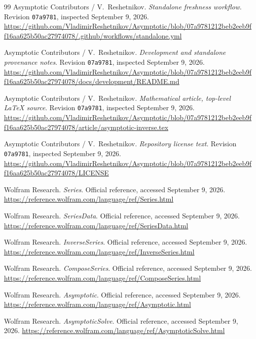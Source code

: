 \documentclass[11pt,a4paper]{article}
\theoremstyle{remark}\newtheorem{remark}[proposition]{Remark}
\begin{document}
\begin{thebibliography}{99}
 Asymptotic Contributors / V.~Reshetnikov. \emph{Standalone freshness workflow}. Revision \texttt{07a9781}, inspected September 9, 2026. \url{https://github.com/VladimirReshetnikov/Asymptotic/blob/07a9781212beb2eeb9ff16aa625b50ac27974078/.github/workflows/standalone.yml}

 Asymptotic Contributors / V.~Reshetnikov. \emph{Development and standalone provenance notes}. Revision \texttt{07a9781}, inspected September 9, 2026. \url{https://github.com/VladimirReshetnikov/Asymptotic/blob/07a9781212beb2eeb9ff16aa625b50ac27974078/docs/development/README.md}

 Asymptotic Contributors / V.~Reshetnikov. \emph{Mathematical article, top-level LaTeX source}. Revision \texttt{07a9781}, inspected September 9, 2026. \url{https://github.com/VladimirReshetnikov/Asymptotic/blob/07a9781212beb2eeb9ff16aa625b50ac27974078/article/asymptotic-inverse.tex}

 Asymptotic Contributors / V.~Reshetnikov. \emph{Repository license text}. Revision \texttt{07a9781}, inspected September 9, 2026. \url{https://github.com/VladimirReshetnikov/Asymptotic/blob/07a9781212beb2eeb9ff16aa625b50ac27974078/LICENSE}

 Wolfram Research. \emph{Series}. Official reference, accessed September 9, 2026. \url{https://reference.wolfram.com/language/ref/Series.html}

 Wolfram Research. \emph{SeriesData}. Official reference, accessed September 9, 2026. \url{https://reference.wolfram.com/language/ref/SeriesData.html}

 Wolfram Research. \emph{InverseSeries}. Official reference, accessed September 9, 2026. \url{https://reference.wolfram.com/language/ref/InverseSeries.html}

 Wolfram Research. \emph{ComposeSeries}. Official reference, accessed September 9, 2026. \url{https://reference.wolfram.com/language/ref/ComposeSeries.html}

 Wolfram Research. \emph{Asymptotic}. Official reference, accessed September 9, 2026. \url{https://reference.wolfram.com/language/ref/Asymptotic.html}

 Wolfram Research. \emph{AsymptoticSolve}. Official reference, accessed September 9, 2026. \url{https://reference.wolfram.com/language/ref/AsymptoticSolve.html}


\end{thebibliography}
\end{document}
